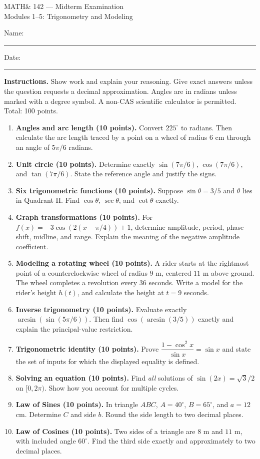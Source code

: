 \documentclass[11pt]{article}
\newcommand{\work}{\vspace{1.15in}}
\begin{document}
\begin{center}{\LARGE MATH\& 142 --- Midterm Examination}\\[5pt]
{\large Modules 1--5: Trigonometry and Modeling}\end{center}
Name:\ \rule{3in}{.4pt}\hfill Date:\ \rule{1.4in}{.4pt}

\smallskip\noindent\textbf{Instructions.} Show work and explain your reasoning. Give exact answers unless the question requests a decimal approximation. Angles are in radians unless marked with a degree symbol. A non-CAS scientific calculator is permitted. Total: 100 points.
\begin{enumerate}
\item \textbf{Angles and arc length (10 points).}
Convert $225^\circ$ to radians. Then calculate the arc length traced by a point on a wheel of radius $6$ cm through an angle of $5\pi/6$ radians.\work
\item \textbf{Unit circle (10 points).}
Determine exactly $\sin(7\pi/6)$, $\cos(7\pi/6)$, and $\tan(7\pi/6)$. State the reference angle and justify the signs.\work
\item \textbf{Six trigonometric functions (10 points).}
Suppose $\sin\theta=3/5$ and $\theta$ lies in Quadrant II. Find $\cos\theta$, $\sec\theta$, and $\cot\theta$ exactly.\work
\item \textbf{Graph transformations (10 points).}
For $f(x)=-3\cos(2(x-\pi/4))+1$, determine amplitude, period, phase shift, midline, and range. Explain the meaning of the negative amplitude coefficient.\work
\item \textbf{Modeling a rotating wheel (10 points).}
A rider starts at the rightmost point of a counterclockwise wheel of radius $9$ m, centered $11$ m above ground. The wheel completes a revolution every $36$ seconds. Write a model for the rider's height $h(t)$, and calculate the height at $t=9$ seconds.\work
\item \textbf{Inverse trigonometry (10 points).}
Evaluate exactly $\arcsin(\sin(5\pi/6))$. Then find $\cos(\arcsin(3/5))$ exactly and explain the principal-value restriction.\work
\item \textbf{Trigonometric identity (10 points).}
Prove $\dfrac{1-\cos^2x}{\sin x}=\sin x$ and state the set of inputs for which the displayed equality is defined.\work
\item \textbf{Solving an equation (10 points).}
Find \emph{all} solutions of $\sin(2x)=\sqrt{3}/2$ on $[0,2\pi)$. Show how you account for multiple cycles.\work
\item \textbf{Law of Sines (10 points).}
In triangle $ABC$, $A=40^\circ$, $B=65^\circ$, and $a=12$ cm. Determine $C$ and side $b$. Round the side length to two decimal places.\work
\item \textbf{Law of Cosines (10 points).}
Two sides of a triangle are $8$ m and $11$ m, with included angle $60^\circ$. Find the third side exactly and approximately to two decimal places.\work
\end{enumerate}
\end{document}
